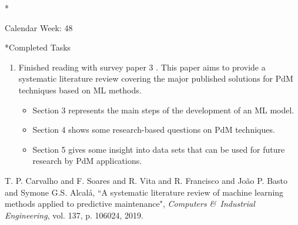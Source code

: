 \documentclass[11pt,a4paper]{article}
\begin{document}
\newpage
\begin{section}*{Calendar Week: 48 \hfill \date{27 November, 2020}}

\begin{subsection}*{Completed Tasks}
    \begin{enumerate}
        \item Finished reading with survey paper 3 \cite{survey1}.
            This paper aims to provide a systematic literature review covering the major published solutions for PdM techniques based on ML methods.
            \begin{itemize}
            \item Section 3 represents the main steps of the development of an ML model.
            \item Section 4 shows some research-based questions on PdM techniques.
            \item Section 5 gives some insight into data sets that can be used for future research by PdM applications.
            \end{itemize}
    \end{enumerate}
\end{subsection}

\begin{thebibliography}{9}
    {T. P. Carvalho and F. Soares and R. Vita and R. Francisco and Jo{\~a}o P. Basto and Symone G.S. Alcal{\'a}},
    “A systematic literature review of machine learning methods applied to predictive maintenance",
    \textit{Computers \&\ Industrial Engineering},
    vol. 137,
    p. 106024,
    2019.
\end{thebibliography}
\end{section}


\newpage
\end{document}
